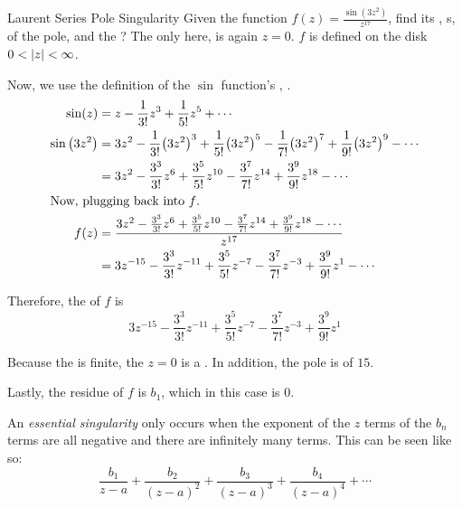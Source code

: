 \begin{example}{Laurent Series Pole Singularity}
  Given the function $f(z) = \frac{\sin \left( 3 z^{2} \right)}{z^{17}}$, find its , s,  of the pole, and the ?
  \tcblower{}
  The only  here, is again $z=0$.
  $f$ is defined on the  disk $0 < \left\lvert z \right\rvert < \infty$.

  Now, we use the definition of the $\sin$ function's , .
  \begin{align*}
    \sin(z) &= z - \frac{1}{3!} z^{3} + \frac{1}{5!} z^{5} + \cdots \\
    \sin \left( 3z^{2} \right) &= 3z^{2} - \frac{1}{3!} { \left( 3z^{2} \right)}^{3} + \frac{1}{5!} {\left( 3z^{2} \right)}^{5} - \frac{1}{7!} { \left( 3z^{2} \right)}^{7} + \frac{1}{9!} { \left( 3z^{2} \right)}^{9} - \cdots \\
            &= 3z^{2} - \frac{3^{3}}{3!} z^{6} + \frac{3^{5}}{5!} z^{10} - \frac{3^{7}}{7!} z^{14} + \frac{3^{9}}{9!} z^{18} - \cdots \\
    \shortintertext{Now, plugging back into $f$.}
    f(z) &= \frac{3z^{2} - \frac{3^{3}}{3!} z^{6} + \frac{3^{5}}{5!} z^{10} - \frac{3^{7}}{7!} z^{14} + \frac{3^{9}}{9!} z^{18} - \cdots}{z^{17}} \\
            &= 3z^{-15} - \frac{3^{3}}{3!} z^{-11} + \frac{3^{5}}{5!} z^{-7} - \frac{3^{7}}{7!} z^{-3} + \frac{3^{9}}{9!} z^{1} - \cdots
  \end{align*}

  Therefore, the  of $f$ is
  \begin{equation*}
    3z^{-15} - \frac{3^{3}}{3!} z^{-11} + \frac{3^{5}}{5!} z^{-7} - \frac{3^{7}}{7!} z^{-3} + \frac{3^{9}}{9!} z^{1}
  \end{equation*}

  Because the  is finite, the  $z=0$ is a .
  In addition, the pole is of  $15$.

  Lastly, the residue of $f$ is
  $b_{1}$, which in this case is $0$.
\end{example}

\begin{definition}\label{def:Essential_Singularity}
  An \emph{essential singularity} only occurs when the exponent of the $z$ terms of the $b_{n}$ terms are all negative and there are infinitely many terms.
  This can be seen like so:
  \begin{equation*}
    \frac{b_{1}}{z-a} + \frac{b_{2}}{{(z-a)}^{2}} + \frac{b_{3}}{{(z-a)}^{3}} + \frac{b_{4}}{{(z-a)}^{4}} + \cdots
  \end{equation*}
\end{definition}


